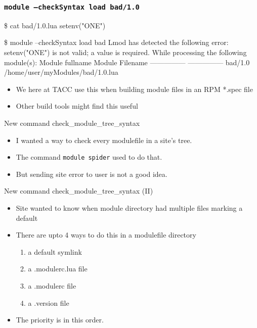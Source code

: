 \documentclass{beamer}
\begin{document}
\begin{frame}[fragile]
    \frametitle{\texttt{module --checkSyntax load bad/1.0}}
 {\tiny
    \begin{semiverbatim}
\$ cat bad/1.0.lua
setenv("ONE")

\$ module --checkSyntax load bad   
Lmod has detected the following error:  setenv("ONE") is not valid;
a value is required. 
While processing the following module(s):
    Module fullname  Module Filename
    ---------------  ---------------
    bad/1.0          /home/user/myModules/bad/1.0.lua

    \end{semiverbatim}
}
  \begin{itemize}
    \item We here at TACC use this when building module files in an RPM
      *.spec file
    \item Other build tools might find this useful
  \end{itemize}
\end{frame}


\begin{frame}{New command check\_module\_tree\_syntax}
  \begin{itemize}
    \item I wanted a way to check every modulefile in a site's tree.
    \item The command \texttt{module spider} used to do that. 
    \item But sending site error to user is not a good idea.
  \end{itemize}
\end{frame}

\begin{frame}{New command check\_module\_tree\_syntax (II)}
  \begin{itemize}
    \item Site wanted to know when module directory had multiple files
      marking a default
    \item There are upto 4 ways to do this in a modulefile directory
      \begin{enumerate}
        \item a default symlink
        \item a .modulerc.lua file
        \item a .modulerc file
        \item a .version file
      \end{enumerate}
    \item The priority is in this order.
  \end{itemize}
\end{frame}
\end{document}
